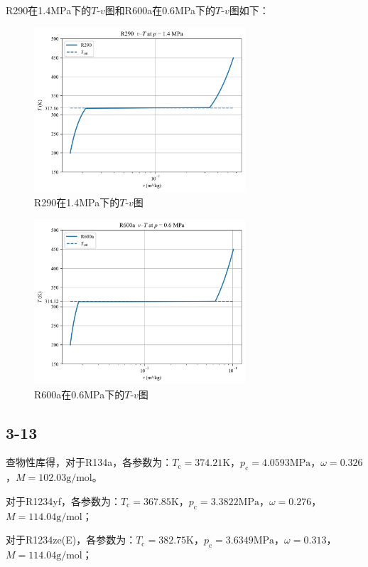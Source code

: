\documentclass[12pt,a4paper]{article}
\begin{document}
R290在1.4MPa下的$T$-$v$图和R600a在0.6MPa下的$T$-$v$图如下：
\begin{figure}[ht]
    \centering
    \includegraphics[width=0.7\textwidth]{R290.png}
    \caption{R290在1.4MPa下的$T$-$v$图}
\end{figure}

\begin{figure}[ht]
    \centering
    \includegraphics[width=0.7\textwidth]{R600a.png}
    \caption{R600a在0.6MPa下的$T$-$v$图}
\end{figure}

\subsection*{3-13}
查物性库得，对于R134a，各参数为：$T_\mathrm{c}=374.21\mathrm{K}$，$p_\mathrm{c}=4.0593\mathrm{MPa}$，$\omega=0.326$，$M=102.03\mathrm{g/mol}$。

对于R1234yf，各参数为：$T_\mathrm{c}=367.85\mathrm{K}$，$p_\mathrm{c}=3.3822\mathrm{MPa}$，$\omega=0.276$，$M=114.04\mathrm{g/mol}$；

对于R1234ze(E)，各参数为：$T_\mathrm{c}=382.75\mathrm{K}$，$p_\mathrm{c}=3.6349\mathrm{MPa}$，$\omega=0.313$，$M=114.04\mathrm{g/mol}$；
\end{document}
